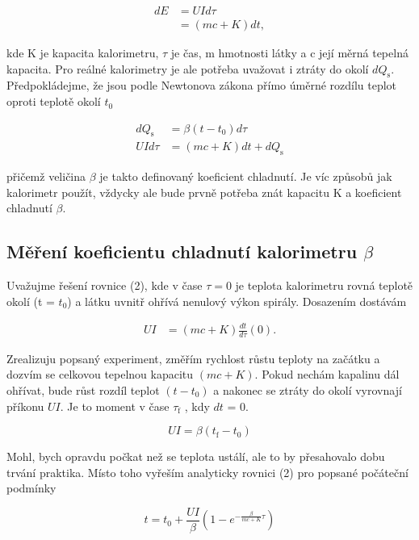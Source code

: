 \documentclass[a4paper,11pt]{article}
\begin{document}
\begin{align}
  dE &= UId\tau \\ 
     &= (mc + K)dt,
\end{align}

\noindent
kde K je kapacita kalorimetru, $\tau$ je čas, m hmotnosti látky a c její měrná tepelná kapacita. Pro reálné kalorimetry je ale potřeba uvažovat i ztráty do okolí $dQ_{\text{s}}$. Předpokládejme, že jsou podle Newtonova zákona přímo úměrné rozdílu teplot oproti teplotě okolí $t_0$

\begin{align}
  dQ_{\text{s}} &= \beta(t - t_0)d\tau \\
  UId\tau &= (mc + K)dt + dQ_{\text{s}}
\end{align}

\noindent
přičemž veličina $\beta$ je takto definovaný koeficient chladnutí. Je víc způsobů jak kalorimetr použít, vždycky ale bude prvně potřeba znát kapacitu K a koeficient chladnutí $\beta$.

\subsection{Měření koeficientu chladnutí kalorimetru $\beta$}
Uvažujme řešení rovnice (2), kde v čase $\tau=0$ je teplota kalorimetru rovná teplotě okolí (t = $t_0$) a látku uvnitř ohřívá nenulový výkon spirály. Dosazením dostávám

\begin{align}
  UI &= (mc + K) \frac{dt}{d\tau}(0).
\end{align}

\noindent
Zrealizuju popsaný experiment, změřím rychlost růstu teploty na začátku a dozvím se celkovou tepelnou kapacitu $(mc + K)$. Pokud nechám kapalinu dál ohřívat, bude růst rozdíl teplot $(t - t_0)$ a nakonec se ztráty do okolí vyrovnají příkonu $UI$. Je to moment v čase $\tau_{\text{f}}$ , kdy $dt$ = 0.

\begin{equation}
UI = \beta (t_{\text{f}} - t_0)
\end{equation}

\noindent
Mohl, bych opravdu počkat než se teplota ustálí, ale to by přesahovalo dobu trvání praktika. Místo toho vyřeším analyticky rovnici (2) pro popsané počáteční podmínky

\begin{equation}
t = t_0 + \frac{UI}{\beta} \left(1 - e^{-\frac{\beta}{mc + K}\tau}\right)
\end{equation}
\end{document}
